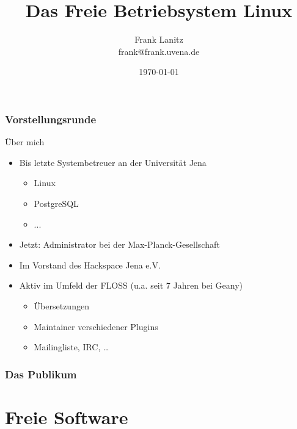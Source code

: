 \documentclass[compress]{beamer}
\title{Das Freie Betriebsystem Linux}
\author{Frank Lanitz \\ \tiny{frank@frank.uvena.de}}
\date{\today}
\begin{document}
\frame{\titlepage}
\begin{frame}
	\tableofcontents{}
\end{frame}
\begin{frame}
	\frametitle{Vorstellungsrunde}
	\begin{block}{Über mich}
		\begin{itemize}
			\item Bis letzte Systembetreuer an der Universität Jena 
				\begin{itemize}
					\item Linux
					\item PostgreSQL
					\item ...
				\end{itemize}
			\item Jetzt: Administrator bei der Max-Planck-Gesellschaft
			\item Im Vorstand des Hackspace Jena e.V.
			\item Aktiv im Umfeld der FLOSS (u.a. seit 7 Jahren bei Geany)
			\begin{itemize}
				\item Übersetzungen
				\item Maintainer verschiedener Plugins
				\item Mailingliste, IRC, \dots
			\end{itemize}
		\end{itemize}
	\end{block}
\end{frame}
\begin{frame}
	\frametitle{Das Publikum}
\end{frame}
\begin{frame}
	\tableofcontents{}
\end{frame}
\section{Freie Software}
\end{document}
